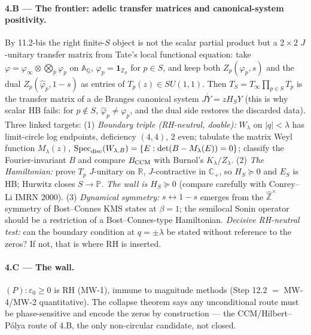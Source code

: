 \documentclass[11pt]{article}
\theoremstyle{remark}
\newcommand{\ve}{\varepsilon}
\begin{document}
\paragraph{4.B --- The frontier: adelic transfer matrices and canonical-system positivity.}
By 11.2-bis the right finite-$S$ object is not the scalar partial product but a $2\times2$
$J$-unitary transfer matrix from Tate's local functional equation: take $\varphi=\varphi_\infty
\otimes\bigotimes_p\varphi_p$ on $\mathbb A_{\mathbb Q}$, $\varphi_p=\mathbf 1_{\mathbb Z_p}$ for
$p\in S$, and keep both $Z_p(\varphi_p,s)$ and the dual $Z_p(\widehat\varphi_p,1-s)$ as entries of
$T_p(z)\in SU(1,1)$. Then $T_S=T_\infty\prod_{p\in S}T_p$ is the transfer matrix of a de Branges
canonical system $J\dot Y=zH_SY$ (this is why scalar HB fails: for $p\notin S$,
$\widehat\varphi_p\ne\varphi_p$, and the dual side restores the discarded data). Three linked
targets:
(1) \emph{Boundary triple (RH-neutral, doable):} $W_\lambda$ on $|q|<\lambda$ has limit-circle log
endpoints, deficiency $(4,4)$, $2$ even; tabulate the matrix Weyl function $M_\lambda(z)$,
$\operatorname{Spec}_{\rm disc}(W_{\lambda,B})=\{E:\det(B-M_\lambda(E))=0\}$; classify the
Fourier-invariant $B$ and compare $B_{\rm CCM}$ with Burnol's $K_\lambda/Z_\lambda$.
(2) \emph{The Hamiltonian:} prove $T_p$ $J$-unitary on $\mathbb R$, $J$-contractive in $\mathbb
C_+$, so $H_S\succeq0$ and $E_S$ is HB; Hurwitz closes $S\to\mathbb P$. \emph{The wall is
$H_S\succeq0$} (compare carefully with Conrey--Li IMRN 2000).
(3) \emph{Dynamical symmetry:} $s\leftrightarrow1-s$ emerges from the $\widehat{\mathbb Z}^\times$
symmetry of Bost--Connes KMS states at $\beta=1$; the semilocal Sonin operator should be a
restriction of a Bost--Connes-type Hamiltonian. \emph{Decisive RH-neutral test:} can the
boundary condition at $q=\pm\lambda$ be stated without reference to the zeros? If not, that is
where RH is inserted.
\paragraph{4.C --- The wall.} $(P):\ve_0\ge0$ is RH (MW-1), immune to magnitude methods (Step
12.2 $=$ MW-4/MW-2 quantitative). The collapse theorem says any unconditional route must be
phase-sensitive and encode the zeros by construction --- the CCM/Hilbert--P\'olya route of 4.B,
the only non-circular candidate, not closed.
\end{document}
